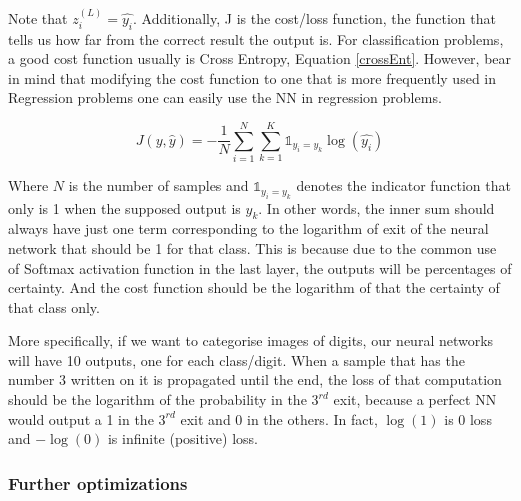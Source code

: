 Note that $z_i^{(L)} = \hat{y_i}$. Additionally, J is the cost/loss function, the function that tells us how far from the correct result the output is. For classification problems, a good cost function usually is Cross Entropy, Equation \eqref{crossEnt}. However, bear in mind that modifying the cost function to one that is more frequently used in Regression problems one can easily use the NN in regression problems.


\begin{equation} \label{crossEnt}
    J(y, \hat{y}) = -\frac{1}{N} \sum_{i=1}^{N} \sum_{k=1}^K \mathbb{1}_{y_i = y_k} \log\left(\hat{y_i}\right)
\end{equation}

Where $N$ is the number of samples and $\mathbb{1}_{y_i = y_k}$ denotes the indicator function that only is 1 when the supposed output is $y_k$. In other words, the inner sum should always have just one term corresponding to the logarithm of exit of the neural network that should be 1 for that class. This is because due to the common use of Softmax activation function in the last layer, the outputs will be percentages of certainty. And the cost function should be the logarithm of that the certainty of that class only.

More specifically, if we want to categorise images of digits, our neural networks will have 10 outputs, one for each class/digit. When a sample that has the number 3 written on it is propagated until the end, the loss of that computation should be the logarithm of the probability in the $3^{rd}$ exit, because a perfect NN would output a 1 in the $3^{rd}$ exit and 0 in the others. In fact, $\log(1)$ is 0 loss and $-\log(0)$ is infinite (positive) loss.














\subsubsection*{Further optimizations}


